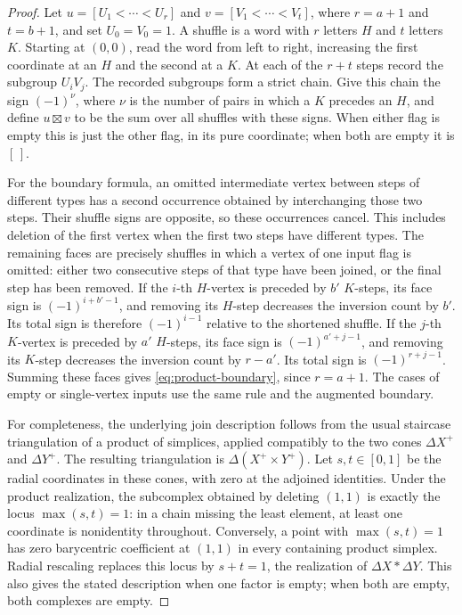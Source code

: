 \begin{proof}
Let
$u=[U_1<\cdots<U_r]$ and $v=[V_1<\cdots<V_t]$, where
$r=a+1$ and $t=b+1$, and set $U_0=V_0=1$.
A shuffle is a word with $r$ letters $H$ and $t$ letters $K$.
Starting at $(0,0)$, read the word from left to right, increasing the
first coordinate at an $H$ and the second at a $K$.
At each of the $r+t$ steps record the subgroup $U_iV_j$.
The recorded subgroups form a strict chain.  Give this chain the sign
$(-1)^{\nu}$, where $\nu$ is the number of pairs in which a $K$
precedes an $H$, and define $u\boxtimes v$ to be the sum over all
shuffles with these signs.  When either flag is empty this is just
the other flag, in its pure coordinate; when both are empty it is
$[\,]$.

For the boundary formula, an omitted intermediate vertex between
steps of different types has a second occurrence obtained by
interchanging those two steps.  Their shuffle signs are opposite,
so these occurrences cancel.  This includes deletion of the first
vertex when the first two steps have different types.  The remaining
faces are precisely shuffles in which a vertex of one input flag is
omitted: either two consecutive steps of that type have been joined,
or the final step has been removed.  If the $i$-th $H$-vertex is
preceded by $b'$ $K$-steps, its face sign is $(-1)^{i+b'-1}$,
and removing its $H$-step decreases the inversion count by $b'$.
Its total sign is therefore $(-1)^{i-1}$ relative to the shortened
shuffle.  If the $j$-th $K$-vertex is preceded by $a'$ $H$-steps,
its face sign is $(-1)^{a'+j-1}$, and removing its $K$-step
decreases the inversion count by $r-a'$.  Its total sign is
$(-1)^{r+j-1}$.  Summing these faces gives
\eqref{eq:product-boundary}, since $r=a+1$.  The cases of empty or
single-vertex inputs use the same rule and the augmented boundary.

For completeness, the underlying join description follows from the
usual staircase triangulation of a product of simplices, applied
compatibly to the two cones $\Delta X^+$ and $\Delta Y^+$.
The resulting triangulation is
$\Delta(X^+\times Y^+)$.  Let $s,t\in[0,1]$ be the radial
coordinates in these cones, with zero at the adjoined identities.
Under the product realization, the subcomplex obtained by deleting
$(1,1)$ is exactly the locus $\max(s,t)=1$: in a chain missing the
least element, at least one coordinate is nonidentity throughout.
Conversely, a point with $\max(s,t)=1$ has zero barycentric
coefficient at $(1,1)$ in every containing product simplex.
Radial rescaling replaces this locus by $s+t=1$, the realization of
$\Delta X*\Delta Y$.  This also gives the stated description when
one factor is empty; when both are empty, both complexes are empty.
\end{proof}

